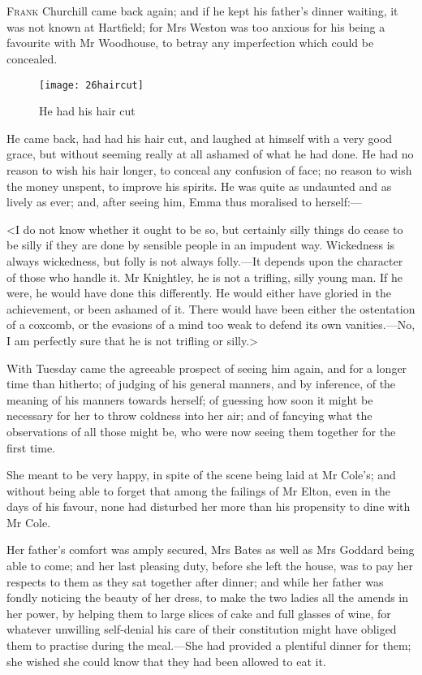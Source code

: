 \chapter[Chapter \thechapter]{}
\lettrine[lraise=0.3]{F}{rank} Churchill came back again; and if he kept his father's dinner waiting, it was not known at Hartfield; for Mrs Weston was too anxious for his being a favourite with Mr Woodhouse, to betray any imperfection which could be concealed.

\begin{figure}[tbph]
\centering
\texttt{[image: 26haircut]}
\caption{He had his hair cut}
\end{figure}

He came back, had had his hair cut, and laughed at himself with a very good grace, but without seeming really at all ashamed of what he had done. He had no reason to wish his hair longer, to conceal any confusion of face; no reason to wish the money unspent, to improve his spirits. He was quite as undaunted and as lively as ever; and, after seeing him, Emma thus moralised to herself:—

<I do not know whether it ought to be so, but certainly silly things do cease to be silly if they are done by sensible people in an impudent way. Wickedness is always wickedness, but folly is not always folly.—It depends upon the character of those who handle it. Mr Knightley, he is not a trifling, silly young man. If he were, he would have done this differently. He would either have gloried in the achievement, or been ashamed of it. There would have been either the ostentation of a coxcomb, or the evasions of a mind too weak to defend its own vanities.—No, I am perfectly sure that he is not trifling or silly.>

With Tuesday came the agreeable prospect of seeing him again, and for a longer time than hitherto; of judging of his general manners, and by inference, of the meaning of his manners towards herself; of guessing how soon it might be necessary for her to throw coldness into her air; and of fancying what the observations of all those might be, who were now seeing them together for the first time.

She meant to be very happy, in spite of the scene being laid at Mr Cole's; and without being able to forget that among the failings of Mr Elton, even in the days of his favour, none had disturbed her more than his propensity to dine with Mr Cole.

Her father's comfort was amply secured, Mrs Bates as well as Mrs Goddard being able to come; and her last pleasing duty, before she left the house, was to pay her respects to them as they sat together after dinner; and while her father was fondly noticing the beauty of her dress, to make the two ladies all the amends in her power, by helping them to large slices of cake and full glasses of wine, for whatever unwilling self-denial his care of their constitution might have obliged them to practise during the meal.—She had provided a plentiful dinner for them; she wished she could know that they had been allowed to eat it.


